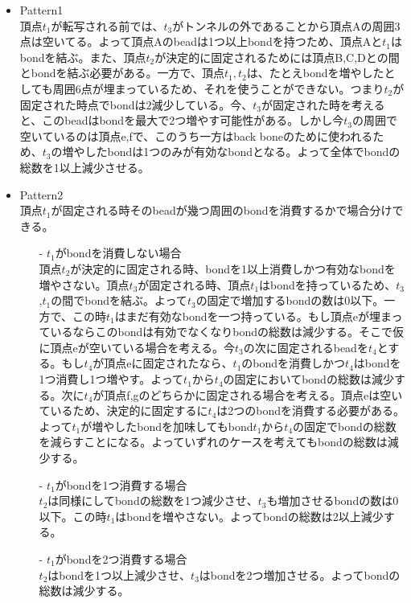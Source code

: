 \documentclass[runningheads]{llncs}
\begin{document}
\begin{itemize}
\item{Pattern1}\\
  頂点$t_1$が転写される前では、$t_3$がトンネルの外であることから頂点Aの周囲3点は空いてる。よって頂点Aのbeadは1つ以上bondを持つため、頂点Aと$t_1$はbondを結ぶ。また、頂点$t_2$が決定的に固定されるためには頂点B,C,Dとの間とbondを結ぶ必要がある。一方で、頂点$t_1,t_2$は、たとえbondを増やしたとしても周囲6点が埋まっているため、それを使うことができない。つまり$t_2$が固定された時点でbondは$2$減少している。今、$t_3$が固定された時を考えると、このbeadはbondを最大で2つ増やす可能性がある。しかし今$t_3$の周囲で空いているのは頂点e,fで、このうち一方はback boneのために使われるため、$t_3$の増やしたbondは1つのみが有効なbondとなる。よって全体でbondの総数を1以上減少させる。

\item{Pattern2}\\
  頂点$t_1$が固定される時そのbeadが幾つ周囲のbondを消費するかで場合分けできる。
  \begin{itemize}
  \item[-]{$t_1$がbondを消費しない場合}\\
    頂点$t_2$が決定的に固定される時、bondを1以上消費しかつ有効なbondを増やさない。頂点$t_3$が固定される時、頂点$t_1$はbondを持っているため、$t_3$,$t_1$の間でbondを結ぶ。よって$t_3$の固定で増加するbondの数は0以下。一方で、この時$t_1$はまだ有効なbondを一つ持っている。もし頂点eが埋まっているならこのbondは有効でなくなりbondの総数は減少する。そこで仮に頂点eが空いている場合を考える。今$t_3$の次に固定されるbeadを$t_4$とする。もし$t_4$が頂点eに固定されたなら、$t_1$のbondを消費しかつ$t_4$はbondを1つ消費し1つ増やす。よって$t_1$から$t_4$の固定においてbondの総数は減少する。次に$t_4$が頂点f,gのどちらかに固定される場合を考える。頂点eは空いているため、決定的に固定するに$t_4$は2つのbondを消費する必要がある。よって$t_1$が増やしたbondを加味してもbond$t_1$から$t_4$の固定でbondの総数を減らすことになる。よっていずれのケースを考えてもbondの総数は減少する。

  \item[-]{$t_1$がbondを1つ消費する場合}\\
    $t_2$は同様にしてbondの総数を1つ減少させ、$t_3$も増加させるbondの数は0以下。この時$t_1$はbondを増やさない。よってbondの総数は2以上減少する。
  \item[-]{$t_1$がbondを2つ消費する場合}\\
    $t_2$はbondを1つ以上減少させ、$t_3$はbondを2つ増加させる。よってbondの総数は減少する。
  \end{itemize}
\end{itemize}
\end{document}
